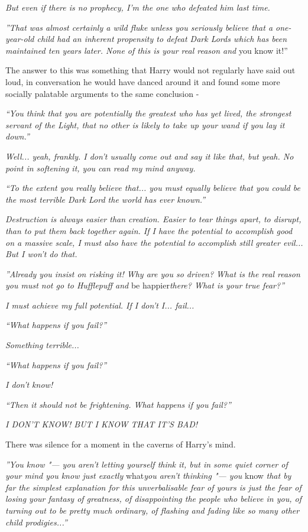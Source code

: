 \emph{But even if there is no prophecy, I'm the one who defeated him
last time.}

\emph{''That was almost certainly a wild fluke unless you seriously
believe that a one-year-old child had an inherent propensity to defeat
Dark Lords which has been maintained ten years later. None of this is
your real reason and} you know it!''

The answer to this was something that Harry would not regularly have
said out loud, in conversation he would have danced around it and found
some more socially palatable arguments to the same conclusion -

\emph{``You think that you are potentially the greatest who has yet
lived, the strongest servant of the Light, that no other is likely to
take up your wand if you lay it down.''}

\emph{Well... yeah, frankly. I don't usually come out and say it
like that, but yeah. No point in softening it, you can read my mind
anyway.}

\emph{``To the extent you really believe that... you must equally
believe that you could be the most terrible Dark Lord the world has ever
known.''}

\emph{Destruction is always easier than creation. Easier to tear things
apart, to disrupt, than to put them back together again. If I have the
potential to accomplish good on a massive scale, I must also have the
potential to accomplish still greater evil... But I won't do that.}

\emph{''Already you insist on risking it! Why are you so driven? What is
the real reason you must not go to Hufflepuff and} be
happier\emph{there? What is your true fear?''}

\emph{I must achieve my full potential. If I don't I...
fail...}

\emph{``What happens if you fail?''}

\emph{Something terrible...}

\emph{``What happens if you fail?''}

\emph{I don't know!}

\emph{``Then it should not be frightening. What happens if you fail?''}

\emph{I DON'T KNOW! BUT I KNOW THAT IT'S BAD!}

There was silence for a moment in the caverns of Harry's mind.

\emph{''You know "--- you aren't letting yourself think it, but in some
quiet corner of your mind you know just exactly} what\emph{you aren't
thinking "--- you} know \emph{that by far the simplest explanation for this
unverbalisable fear of yours is just the fear of losing your fantasy of
greatness, of disappointing the people who believe in you, of turning
out to be pretty much ordinary, of flashing and fading like so many
other child prodigies...''}

